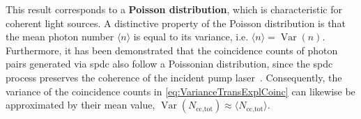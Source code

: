This result corresponds to a \textbf{Poisson distribution}, which is characteristic for coherent light sources. A distinctive property of the Poisson distribution is that the mean photon number $\langle n \rangle$ is equal to its variance, i.e. $\langle n \rangle = \operatorname{Var}(n)$. \newline
Furthermore, it has been demonstrated that the coincidence counts of photon pairs generated via \acrshort{spdc} also follow a Poissonian distribution, since the \acrshort{spdc} process preserves the coherence of the incident pump laser~\cite{avenhausPhotonNumberStatistics2008,schneelochIntroductionAbsoluteBrightness2019,kimPhotoncountingStatisticsbasedSupport2022}. Consequently, the variance of the coincidence counts in \autoref{eq:VarianceTransExplCoinc} can likewise be approximated by their mean value, $ \operatorname{Var}(N_{\text{cc,tot}}) \approx \langle N_{\text{cc,tot}} \rangle$.

